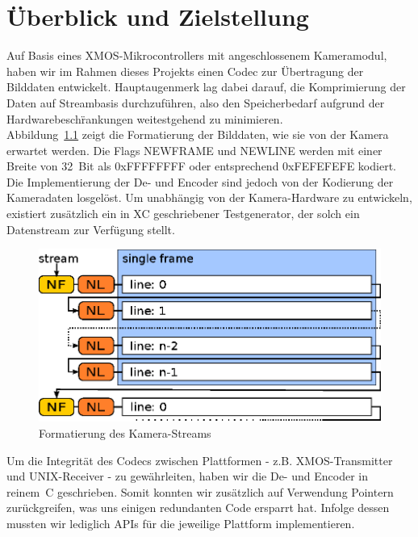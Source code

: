
\chapter{\"Uberblick und Zielstellung}
Auf Basis eines XMOS-Mikrocontrollers mit angeschlossenem Kameramodul, haben wir
im Rahmen dieses Projekts einen Codec zur \"Ubertragung der Bilddaten entwickelt.
Hauptaugenmerk lag dabei darauf, die Komprimierung der Daten auf Streambasis
durchzuf\"uhren, also den Speicherbedarf aufgrund der Hardwarebesch\"rankungen 
weitestgehend zu minimieren.\\
Abbildung~\ref{fig:cam-stream} zeigt die Formatierung der Bilddaten, wie sie von
der Kamera erwartet werden. Die Flags NEWFRAME und NEWLINE werden mit einer
Breite von 32~Bit als 0xFFFFFFFF oder entsprechend 0xFEFEFEFE kodiert. Die
Implementierung der De- und Encoder sind jedoch von der Kodierung der
Kameradaten losgel\"ost. Um unabh\"angig von der Kamera-Hardware zu entwickeln,
existiert zus\"atzlich ein in XC geschriebener Testgenerator, der solch ein
Datenstream zur Verf\"ugung stellt.
%
\begin{figure}[htbp]
\begin{center}
\includegraphics{img/cam-stream}
\end{center}
\caption{Formatierung des Kamera-Streams}
\label{fig:cam-stream}
\end{figure}

Um die Integrit\"at des Codecs zwischen Plattformen - z.B. XMOS-Transmitter 
und UNIX-Receiver - zu gew\"ahrleiten, haben wir die De- und Encoder
in reinem~C geschrieben. Somit konnten wir zus\"atzlich auf Verwendung Pointern
zur\"uckgreifen, was uns einigen redundanten Code ersparrt hat. Infolge dessen
mussten wir lediglich APIs f\"ur die jeweilige Plattform implementieren.
